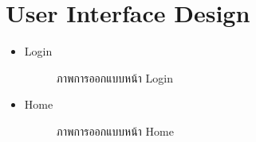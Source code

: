 \documentclass[12pt,oneside,openright,a4paper]{cpe-thai-project}
\begin{document}
 











\newpage
\section{User Interface Design}
\begin{itemize}
  \item Login
  \begin{figure}[!ht]\centering
    \setlength{\fboxrule}{0.2mm} %
    \setlength{\fboxsep}{1cm}
    \caption{ภาพการออกแบบหน้า Login}\label{fig:system}
  \end{figure}
  \item Home
  \begin{figure}[!ht]\centering
    \setlength{\fboxrule}{0.2mm} %
    \setlength{\fboxsep}{1cm}
    \caption{ภาพการออกแบบหน้า Home}\label{fig:system}

\end{figure}
\end{itemize}
\end{document}
